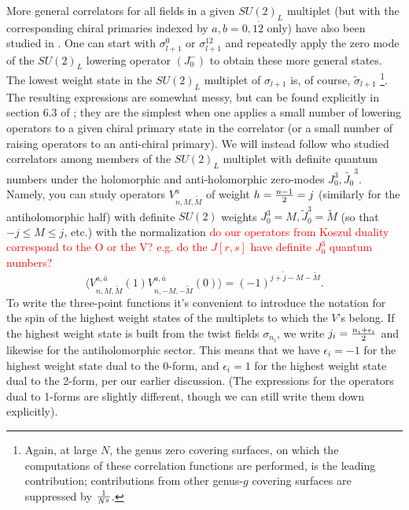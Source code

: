 \documentclass[11pt]{amsart}
\theoremstyle{thm}
\numberwithin{equation}{subsection}
\theoremstyle{def}
\theoremstyle{rem}
\begin{document}
More general correlators for all fields in a given $SU(2)_L$ multiplet (but with the corresponding chiral primaries indexed by $a,b= 0, 1\dot{2}$ only) have also been studied in \cite{LuninMathur}. One can start with $\sigma^{0}_{l+1}$ or $\sigma^{1\dot{2}}_{l+1}$ and repeatedly apply the zero mode of the $SU(2)_L$ lowering operator $(J_0^-)$ to obtain these more general states. The lowest weight state in the $SU(2)_L$ multiplet of $\sigma_{l+1}$ is, of course, $\tilde{\sigma}_{l+1}$ \footnote{Again, at large $N$, the genus zero covering surfaces, on which the computations of these correlation functions are performed, is the leading contribution; contributions from other genus-$g$ covering surfaces are suppressed by ${1 \over N^g}$.}. The resulting expressions are somewhat messy, but can be found explicitly in section 6.3 of \cite{LuninMathur}; they are the simplest when one applies a small number of lowering operators to a given chiral primary state in the correlator (or a small number of raising operators to an anti-chiral primary).   We will instead follow \cite{PakmanSever} who studied correlators among members of the $SU(2)_L$ multiplet with definite quantum numbers under the holomorphic and anti-holomorphic zero-modes $J_0^3, \tilde{J_0}^3$.  Namely, you can study operators $V^a_{n, M, \tilde{M}}$ of weight $h = {n-1 \over 2} = j$ (similarly for the antiholomorphic half) with definite $SU(2)$ weights $J_0^3 = M, \tilde{J}_0^3 = \tilde{M}$ (so that $-j \leq M \leq j$, etc.) with the normalization \textcolor{red}{do our operators from Koszul duality correspond to the O or the V? e.g. do the $J[r, s]$ have definite $J_0^3$ quantum numbers?}
\begin{equation}
\langle V^{a, \bar{a}}_{n, M, \tilde{M}}(1) V^{a, \bar{a}}_{n, -M, -\tilde{M}}(0)\rangle = (-1)^{j + \tilde{j} - M - \tilde{M}}.
\end{equation}
To write the three-point functions it's convenient to introduce the notation for the spin of the highest weight states of the multiplets to which the $V$'s belong. If the highest weight state is built from the twist fields $\sigma_{n_i}$, we write $j_i = {n_i + \epsilon_i \over 2}$ and likewise for the antiholomorphic sector. This means that we have $\epsilon_i = -1$ for the highest weight state dual to the 0-form, and $\epsilon_i = 1$ for the highest weight state dual to the 2-form, per our earlier discussion. (The expressions for the operators dual to 1-forms are slightly different, though we can still write them down explicitly).  
\end{document}

